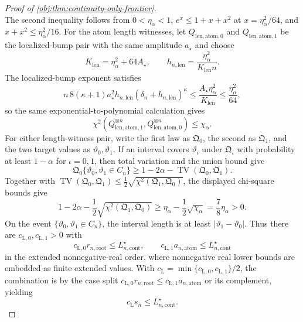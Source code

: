 \documentclass[11pt]{article}
\begin{document}
\begin{proof}[Proof of \cref{obj:thm:continuity-only-frontier}]
\[\]
The second inequality follows from \(0<\eta_\alpha<1\),
\(e^x\leq1+x+x^2\) at \(x=\eta_\alpha^2/64\), and
\(x+x^2\leq\eta_\alpha^2/16\).  For the atom length witnesses, let
\(Q_{\mathrm{len},\mathrm{atom},0}\) and \(Q_{\mathrm{len},\mathrm{atom},1}\) be the localized-bump pair with the same amplitude \(a_\star\) and choose
\[
K_{\mathrm{len}}=\eta_\alpha^2+64A_\star,
\qquad
h_{n,\mathrm{len}}=\frac{\eta_\alpha^2}{K_{\mathrm{len}}n}.
\]
The localized-bump exponent satisfies
\[
n\,8(\kappa+1)a_\star^2h_{n,\mathrm{len}}
(\delta_n+h_{n,\mathrm{len}})^\kappa
\leq
\frac{A_\star\eta_\alpha^2}{K_{\mathrm{len}}}
\leq \frac{\eta_\alpha^2}{64},
\]
so the same exponential-to-polynomial calculation gives
\[
\chi^2(Q_{\mathrm{len},\mathrm{atom},1}^{\otimes n},
Q_{\mathrm{len},\mathrm{atom},0}^{\otimes n})\leq \chi_\alpha.
\]
For either length-witness pair, write the first law as \(\mathfrak Q_0\), the second as
\(\mathfrak Q_1\), and the two target values as \(\vartheta_0,\vartheta_1\).  If an interval covers
\(\vartheta_\iota\) under \(\mathfrak Q_\iota\) with probability at least \(1-\alpha\) for
\(\iota=0,1\), then total variation and the union bound give
\[
\mathfrak Q_0\{\vartheta_0,\vartheta_1\in C_n\}
\geq
1-2\alpha-\operatorname{TV}(\mathfrak Q_0,\mathfrak Q_1).
\]
Together with
\(\operatorname{TV}(\mathfrak Q_0,\mathfrak Q_1)\leq
\frac12\sqrt{\chi^2(\mathfrak Q_1,\mathfrak Q_0)}\), the displayed chi-square bounds give
\[
1-2\alpha-\frac12\sqrt{\chi^2(\mathfrak Q_1,\mathfrak Q_0)}
\geq
\eta_\alpha-\frac12\sqrt{\chi_\alpha}
=
\frac78\eta_\alpha>0 .
\]
On the event \(\{\vartheta_0,\vartheta_1\in C_n\}\), the interval length is at least
\(|\vartheta_1-\vartheta_0|\).  Thus there are \(c_{\mathrm L,0},c_{\mathrm L,1}>0\) with
\[
c_{\mathrm L,0}r_{n,\mathrm{root}}
\leq L_{n,\mathrm{cont}}^\star,
\qquad
c_{\mathrm L,1}a_{n,\mathrm{atom}}
\leq L_{n,\mathrm{cont}}^\star
\]
in the extended nonnegative-real order, where nonnegative real lower bounds are embedded as finite extended values.  With
\(c_{\mathrm L}=\min\{c_{\mathrm L,0},c_{\mathrm L,1}\}/2\), the combination is by the case split
\(c_{\mathrm L,0}r_{n,\mathrm{root}}\leq c_{\mathrm L,1}a_{n,\mathrm{atom}}\) or its complement, yielding
\[
c_{\mathrm L}s_n\leq L_{n,\mathrm{cont}}^\star .
\]


\end{proof}
\end{document}
